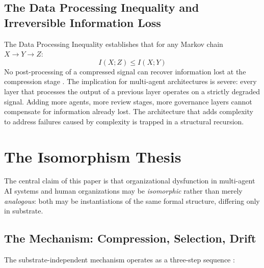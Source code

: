 \documentclass[11pt,a4paper]{article}
\begin{document}
\subsection{The Data Processing Inequality and Irreversible Information Loss}

The Data Processing Inequality establishes that for any Markov chain $X \to Y \to Z$:
\begin{equation}
\label{eq:dpi}
I(X;Z) \leq I(X;Y)
\end{equation}
No post-processing of a compressed signal can recover information lost at the compression stage \citep{cover2006}. The implication for multi-agent architectures is severe: every layer that processes the output of a previous layer operates on a strictly degraded signal. Adding more agents, more review stages, more governance layers cannot compensate for information already lost. The architecture that adds complexity to address failures caused by complexity is trapped in a structural recursion.


\section{The Isomorphism Thesis}
\label{sec:isomorphism}

The central claim of this paper is that organizational dysfunction in multi-agent AI systems and human organizations may be \emph{isomorphic} rather than merely \emph{analogous}: both may be instantiations of the same formal structure, differing only in substrate.

\subsection{The Mechanism: Compression, Selection, Drift}

The substrate-independent mechanism operates as a three-step sequence \citep{mcentire2025channel}:
\end{document}
